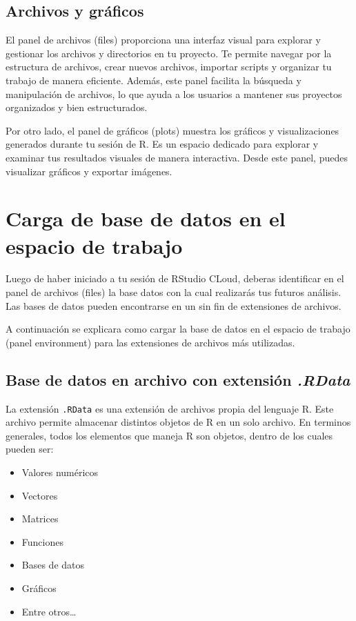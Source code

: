 \documentclass[
]{article}
\providecommand{\tightlist}{%
  \setlength{\itemsep}{0pt}\setlength{\parskip}{0pt}}
\begin{document}
\subsection{Archivos y gráficos}\label{archivos-y-gruxe1ficos}

El panel de archivos (files) proporciona una interfaz visual para
explorar y gestionar los archivos y directorios en tu proyecto. Te
permite navegar por la estructura de archivos, crear nuevos archivos,
importar scripts y organizar tu trabajo de manera eficiente. Además,
este panel facilita la búsqueda y manipulación de archivos, lo que ayuda
a los usuarios a mantener sus proyectos organizados y bien
estructurados.

Por otro lado, el panel de gráficos (plots) muestra los gráficos y
visualizaciones generados durante tu sesión de R. Es un espacio dedicado
para explorar y examinar tus resultados visuales de manera interactiva.
Desde este panel, puedes visualizar gráficos y exportar imágenes.

\section{\texorpdfstring{\textbf{Carga de base de datos en el espacio de
trabajo}}{Carga de base de datos en el espacio de trabajo}}\label{carga-de-base-de-datos-en-el-espacio-de-trabajo}

Luego de haber iniciado a tu sesión de RStudio CLoud, deberas
identificar en el panel de archivos (files) la base datos con la cual
realizarás tus futuros análisis. Las bases de datos pueden encontrarse
en un sin fin de extensiones de archivos.

A continuación se explicara como cargar la base de datos en el espacio
de trabajo (panel environment) para las extensiones de archivos más
utilizadas.

\subsection{\texorpdfstring{Base de datos en archivo con extensión
\emph{.RData}}{Base de datos en archivo con extensión .RData}}\label{base-de-datos-en-archivo-con-extensiuxf3n-.rdata}

La extensión \texttt{.RData} es una extensión de archivos propia del
lenguaje R. Este archivo permite almacenar distintos objetos de R en un
solo archivo. En terminos generales, todos los elementos que maneja R
son objetos, dentro de los cuales pueden ser:

\begin{itemize}
\tightlist
\item
  Valores numéricos
\item
  Vectores
\item
  Matrices
\item
  Funciones
\item
  Bases de datos
\item
  Gráficos
\item
  Entre otros\ldots{}
\end{itemize}
\end{document}
